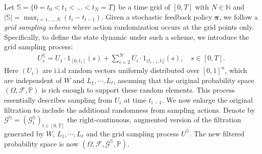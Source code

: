 \documentclass[11pt]{article}
\newcommand{\1}{\mathbbm{1}}
\newcommand{\bpi}{\boldsymbol{\pi}}
\begin{document}
Let $\mathbb{S}= \{0 = t_0 < t_1 < \ldots < t_N = T\}$ be a time grid of $[0, T]$ with $N \in \mathbb{N}$ and $|\mathbb{S}| = \max_{i=1, \ldots,N}(t_i - t_{i-1})$. Given a stochastic feedback policy $\bpi$, we follow a {\it grid sampling scheme} where action randomization occurs at the grid points only. Specifically, to define the state dynamic under such a scheme, we introduce the grid sampling process:
\begin{align} \label{eq:grid-sampling}
U_s^{\mathbb{S}} = U_1  \cdot 1_{[0, t_1]}(s) + \sum_{i=2}^N U_i \cdot 1_{(t_{i-1}, t_i]}(s), \quad s \in [0,T].
\end{align}
Here $(U_i)$ are i.i.d random vectors uniformly distributed over $[0,1]^{n}$, which are independent of $W$ and $L_1,\cdots,L_\ell$, assuming that the original probability space $(\Omega, \mathcal{F}, \mathbb{P})$ is rich enough to support these random elements. This process essentially describes sampling from $U_i$ at time $t_{i-1}$. We now enlarge the original filtration to include the additional randomness from sampling actions. Denote by $\mathcal{G}^{\mathbb{S}} = (\mathcal{G}^{\mathbb{S}}_t)_{t \in [0, T]}$ the right-continuous, augmented version of the filtration generated by $W$, $L_1,\cdots,L_\ell$ and the grid sampling process $U^{\mathbb{S}}$.  The new filtered probability space is now $(\Omega,\mathcal{F}, \mathcal{G}^{\mathbb{S}}, \mathbb{P})$.






\end{document}
